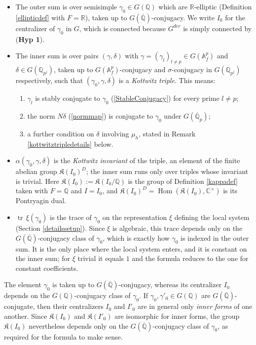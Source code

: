 \documentclass[11pt,a4paper]{article}
\newcommand{\HypOne}{\textbf{Hyp 1}}
\theoremstyle{definition}
\theoremstyle{plain}
\theoremstyle{remark}
\theoremstyle{plain}
\DeclareMathOperator{\tr}{tr}
\DeclareMathOperator{\Hom}{Hom}
\begin{document}
\begin{itemize}
    \item The outer sum is over semisimple $\gamma_0 \in G(\mathbb{Q})$ which are $\mathbb{R}$-elliptic (Definition \ref{ellipticdef} with $F = \mathbb{R}$), taken up to $G(\overline{\mathbb{Q}})$-conjugacy. We write $I_0$ for the centralizer of $\gamma_0$ in $G$, which is connected because $G^{der}$ is simply connected by (\HypOne{}).
    \item The inner sum is over pairs $(\gamma, \delta)$ with $\gamma = (\gamma_l)_{l \neq p} \in G(\mathbb{A}_f^p)$ and $\delta \in G(\mathbb{Q}_{p^j})$, taken up to $G(\mathbb{A}_f^p)$-conjugacy and $\sigma$-conjugacy in $G(\mathbb{Q}_{p^j})$ respectively, such that $(\gamma_0, \gamma, \delta)$ is a \textit{Kottwitz triple}. This means:
    \begin{enumerate}
        \item $\gamma_l$ is stably conjugate to $\gamma_0$ (\ref{StableConjugacy}) for every prime $l \neq p$;
        \item the norm $N\delta$ (\ref{normmap}) is conjugate to $\gamma_0$ under $G(\overline{\mathbb{Q}}_p)$;
        \item a further condition on $\delta$ involving $\mu_h$, stated in Remark \ref{kottwitztripledetails} below.
    \end{enumerate}
    \item $\alpha(\gamma_0, \gamma, \delta)$ is the \textit{Kottwitz invariant} of the triple, an element of the finite abelian group $\mathfrak{K}(I_0)^D$; the inner sum runs only over triples whose invariant is trivial. Here $\mathfrak{K}(I_0) := \mathfrak{K}(I_0/\mathbb{Q})$ is the group of Definition \ref{kappadef} taken with $F = \mathbb{Q}$ and $I = I_0$, and $\mathfrak{K}(I_0)^D = \Hom(\mathfrak{K}(I_0), \mathbb{C}^{\times})$ is its Pontryagin dual.
    \item $\tr\,\xi(\gamma_0)$ is the trace of $\gamma_0$ on the representation $\xi$ defining the local system (Section \ref{detailssetup}). Since $\xi$ is algebraic, this trace depends only on the $G(\overline{\mathbb{Q}})$-conjugacy class of $\gamma_0$, which is exactly how $\gamma_0$ is indexed in the outer sum. It is the only place where the local system enters, and it is constant on the inner sum; for $\xi$ trivial it equals $1$ and the formula reduces to the one for constant coefficients.
\end{itemize}

The element $\gamma_0$ is taken up to $G(\overline{\mathbb{Q}})$-conjugacy, whereas its centralizer $I_0$ depends on the $G(\mathbb{Q})$-conjugacy class of $\gamma_0$. If $\gamma_0, \gamma'_0 \in G(\mathbb{Q})$ are $G(\overline{\mathbb{Q}})$-conjugate, then their centralizers $I_0$ and $I'_0$ are in general only \textit{inner forms} of one another. Since $\mathfrak{K}(I_0)$ and $\mathfrak{K}(I'_0)$ are isomorphic for inner forms, the group $\mathfrak{K}(I_0)$ nevertheless depends only on the $G(\overline{\mathbb{Q}})$-conjugacy class of $\gamma_0$, as required for the formula to make sense.
    
\end{document}

